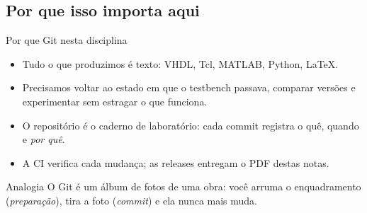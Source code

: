 
\subsection[Por que importa]{Por que isso importa aqui}
\begin{frame}{Por que Git nesta disciplina}
  \begin{itemize}
    \item Tudo o que produzimos é \alert{texto}: VHDL, Tcl, MATLAB, Python, \LaTeX.
    \item Precisamos \alert{voltar} ao estado em que o testbench passava,
      \alert{comparar} versões e \alert{experimentar} sem estragar o que funciona.
    \item O repositório é o \alert{caderno de laboratório}: cada commit registra
      o quê, quando e \emph{por quê}.
    \item A CI verifica cada mudança; as releases entregam o PDF destas notas.
  \end{itemize}
  \vfill
  \begin{block}{Analogia}
    O Git é um álbum de fotos de uma obra: você arruma o enquadramento
    (\emph{preparação}), tira a foto (\emph{commit}) e ela nunca mais muda.
  \end{block}
\end{frame}

